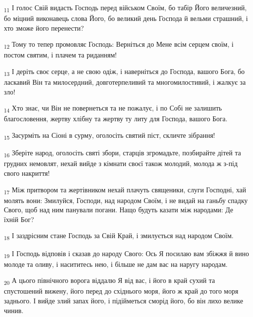 \begin{tcolorbox}
\textsubscript{11} І голос Свій видасть Господь перед військом Своїм, бо табір Його величезний, бо міцний виконавець слова Його, бо великий день Господа й вельми страшний, і хто зможе його перенести?
\end{tcolorbox}
\begin{tcolorbox}
\textsubscript{12} Тому то тепер промовляє Господь: Верніться до Мене всім серцем своїм, і постом святим, і плачем та риданням!
\end{tcolorbox}
\begin{tcolorbox}
\textsubscript{13} І деріть своє серце, а не свою одіж, і наверніться до Господа, вашого Бога, бо ласкавий Він та милосердний, довготерпеливий та многомилостивий, і жалкує за зло!
\end{tcolorbox}
\begin{tcolorbox}
\textsubscript{14} Хто знає, чи Він не повернеться та не пожалує, і по Собі не залишить благословення, жертву хлібну та жертву ту литу для Господа, вашого Бога.
\end{tcolorbox}
\begin{tcolorbox}
\textsubscript{15} Засурміть на Сіоні в сурму, оголосіть святий піст, скличте зібрання!
\end{tcolorbox}
\begin{tcolorbox}
\textsubscript{16} Зберіте народ, оголосіть святі збори, старців згромадьте, позбирайте дітей та грудних немовлят, нехай вийде з кімнати своєї також молодий, молода ж з-під свого накриття!
\end{tcolorbox}
\begin{tcolorbox}
\textsubscript{17} Між притвором та жертівником нехай плачуть священики, слуги Господні, хай молять вони: Змилуйся, Господи, над народом Своїм, і не видай на ганьбу спадку Свого, щоб над ним панували погани. Нащо будуть казати між народами: Де їхній Бог?
\end{tcolorbox}
\begin{tcolorbox}
\textsubscript{18} І заздрісним стане Господь за Свій Край, і змилується над народом Своїм.
\end{tcolorbox}
\begin{tcolorbox}
\textsubscript{19} І Господь відповів і сказав до народу Свого: Ось Я посилаю вам збіжжя й вино молоде та оливу, і насититесь нею, і більше не дам вас на наругу народам.
\end{tcolorbox}
\begin{tcolorbox}
\textsubscript{20} А цього північного ворога віддалю Я від вас, і його в край сухий та спустошений вижену, його перед до східнього моря, його ж край до того моря заднього. І вийде злий запах його, і підійметься сморід його, бо він лихо велике чинив.
\end{tcolorbox}
